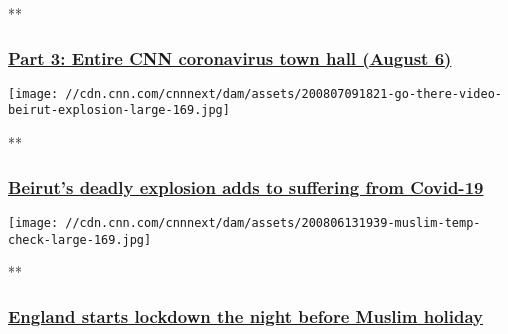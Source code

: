 **

\hypertarget{part-3-entire-cnn-coronavirus-town-hall-august-6}{%
\subsubsection{\texorpdfstring{\href{/videos/health/2020/08/06/entire-august-6-coronavirus-town-hall-part-3-sot-vpx.cnn/video/playlists/coronavirus-intl/}{Part
3: Entire CNN coronavirus town hall (August
6)}}{Part 3: Entire CNN coronavirus town hall (August 6)}}\label{part-3-entire-cnn-coronavirus-town-hall-august-6}}

\href{/videos/world/2020/08/07/beirut-explosion-amplifies-coronavirus-economic-struggles-go-there.cnn/video/playlists/coronavirus-intl/}{}

\texttt{[image: //cdn.cnn.com/cnnnext/dam/assets/200807091821-go-there-video-beirut-explosion-large-169.jpg]}

**

\hypertarget{beiruts-deadly-explosion-adds-to-suffering-from-covid-19}{%
\subsubsection{\texorpdfstring{\href{/videos/world/2020/08/07/beirut-explosion-amplifies-coronavirus-economic-struggles-go-there.cnn/video/playlists/coronavirus-intl/}{Beirut's
deadly explosion adds to suffering from
Covid-19}}{Beirut's deadly explosion adds to suffering from Covid-19}}\label{beiruts-deadly-explosion-adds-to-suffering-from-covid-19}}

\href{/videos/world/2020/08/06/england-lockdown-on-eid-eve-muslims-veselinovic-vpx.cnn/video/playlists/coronavirus-intl/}{}

\texttt{[image: //cdn.cnn.com/cnnnext/dam/assets/200806131939-muslim-temp-check-large-169.jpg]}

**

\hypertarget{england-starts-lockdown-the-night-before-muslim-holiday}{%
\subsubsection{\texorpdfstring{\href{/videos/world/2020/08/06/england-lockdown-on-eid-eve-muslims-veselinovic-vpx.cnn/video/playlists/coronavirus-intl/}{England
starts lockdown the night before Muslim
holiday}}{England starts lockdown the night before Muslim holiday}}\label{england-starts-lockdown-the-night-before-muslim-holiday}}

\href{/videos/world/2020/08/06/russia-vaccine-testing-matthew-chance-pkg-newday-intl-ldn-vpx.cnn/video/playlists/coronavirus-intl/}{}

